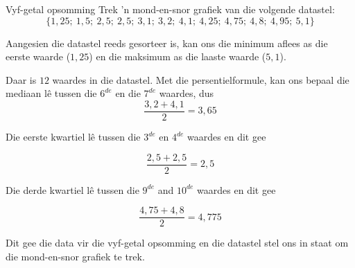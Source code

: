 \begin{wex}{Vyf-getal opsomming}
{Trek ’n mond-en-snor grafiek van die volgende datastel:
    \begin{equation*}
      \{1,25;\ 1,5;\ 2,5;\ 2,5;\ 3,1;\ 3,2;\ 4,1;\ 4,25;\ 4,75;\ 4,8;\ 4,95;\ 5,1\}
    \end{equation*}
}{

  Aangesien die datastel reeds gesorteer is, kan ons die minimum aflees as die eerste waarde ($1,25$) en die maksimum as die laaste waarde ($5,1$).


  Daar is $12$ waardes in die datastel. Met die persentielformule, kan ons bepaal die mediaan lê tussen die $6^{de}$ en die $7^{de}$
  waardes, dus
  \begin{equation*}
    \frac{3,2 + 4,1}{2} = 3,65
  \end{equation*}

  Die eerste kwartiel lê tussen die $3^{de}$ en $4^{de}$ waardes en dit gee
  
  \begin{equation*}
    \frac{2,5 + 2,5}{2} = 2,5
  \end{equation*}

  Die derde kwartiel lê tussen die $9^{de}$ and $10^{de}$ waardes en dit gee
  
  \begin{equation*}
    \frac{4,75 + 4,8}{2} = 4,775
  \end{equation*}

 Dit gee die data vir die vyf-getal opsomming en die datastel stel ons in staat om die mond-en-snor grafiek te trek.

  \begin{center}
  \end{center}
}
\end{wex}

